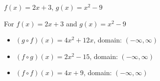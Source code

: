 {$f(x) = 2x+3$, $g(x) = x^2-9$}
{For $f(x) = 2x+3$ and $g(x) = x^2-9$

\begin{itemize}

\item  $(g \circ f)(x) = 4x^2+12x$, domain: $(-\infty, \infty)$

\item  $(f \circ g)(x) = 2x^2-15$, domain: $(-\infty, \infty)$

\item  $(f \circ f)(x) = 4x+9$, domain: $(-\infty, \infty)$

\end{itemize}}